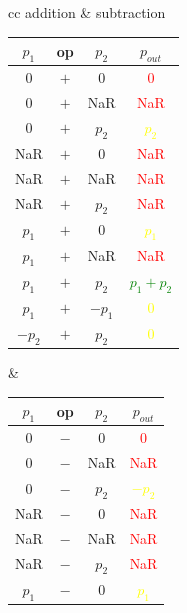 \begin{table}
\begin{center}
\begin{tabular}{ cc }   %
addition & subtraction \\
\begin{tabular}{||c c c | c||}
    \hline
    $p_1$ & op & $p_2$ & $p_{out}$ \\ [0.5ex]
    \hline\hline
    $0$ & $+$ & $0$ & \textcolor{red}{$0$} \\
    \hline
    $0$ & $+$ & NaR & \textcolor{red}{NaR} \\
    \hline
    $0$ & $+$ & $p_2$ & \textcolor{yellow}{$p_2$} \\ %
    \hline
    NaR & $+$ & $0$ & \textcolor{red}{NaR} \\
    \hline
    NaR & $+$ & NaR & \textcolor{red}{NaR} \\
    \hline
    NaR & $+$ & $p_2$ & \textcolor{red}{NaR} \\
    \hline
    $p_1$ & $+$ & $0$ & \textcolor{yellow}{$p_1$} \\
    \hline
    $p_1$ & $+$ & NaR & \textcolor{red}{NaR} \\
    \hline
    $p_1$ & $+$ & $p_2$ & \textcolor{green}{$p_1 + p_2$} \\
    \hline %
    $p_1$ & $+$ & $-p_1$ & \textcolor{yellow}{$0$} \\
    \hline
    $-p_2$ & $+$ & $p_2$ & \textcolor{yellow}{$0$} \\
    \hline
\end{tabular} &
\begin{tabular}{||c c c | c||}
    \hline
    $p_1$ & op & $p_2$ & $p_{out}$ \\ [0.5ex]
    \hline\hline
    $0$ & $-$ & $0$ & \textcolor{red}{$0$} \\
    \hline
    $0$ & $-$ & NaR & \textcolor{red}{NaR} \\
    \hline
    $0$ & $-$ & $p_2$ & \textcolor{yellow}{$-p_2$} \\ %
    \hline
    NaR & $-$ & $0$ & \textcolor{red}{NaR} \\
    \hline
    NaR & $-$ & NaR & \textcolor{red}{NaR} \\
    \hline
    NaR & $-$ & $p_2$ & \textcolor{red}{NaR} \\
    \hline
    $p_1$ & $-$ & $0$ & \textcolor{yellow}{$p_1$} \\

\end{tabular}
\end{tabular}
\end{center}
\end{table}
